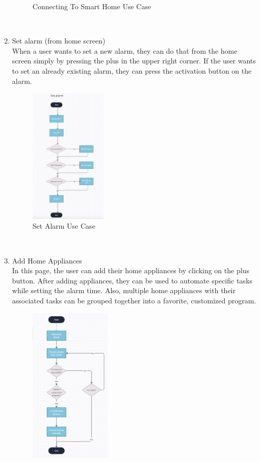 \documentclass[conference]{IEEEtran}
\begin{document}
\begin{enumerate}
\begin{figure}[htbp]
            \caption{Connecting To Smart Home Use Case}
            \label{fig}
        \end{figure}\\
    \item Set alarm (from home screen) \\
       When a user wants to set a new alarm, they can do that from the home screen simply by pressing the plus in the upper right corner. If the user wants to set an already existing alarm, they can press the activation button on the alarm.
        \begin{figure}[htbp]
            \centerline{\includegraphics[height=65mm,scale=0.5]{Images/UseCase_SetAlarm.jpeg}}
            \caption{Set Alarm Use Case}
            \label{fig}
        \end{figure}\\
    \item Add Home Appliances \\
       In this page, the user can add their home appliances by clicking on the plus button. After adding appliances, they can be used to automate specific tasks while setting the alarm time. Also, multiple home appliances with their associated tasks can be grouped together into a favorite, customized program. 
        \begin{figure}[htbp]
            \centerline{\includegraphics[height=75mm,scale=0.5]{Images/UseCase_ConnectDevice.png}}

\end{figure}
\end{enumerate}
\end{document}
